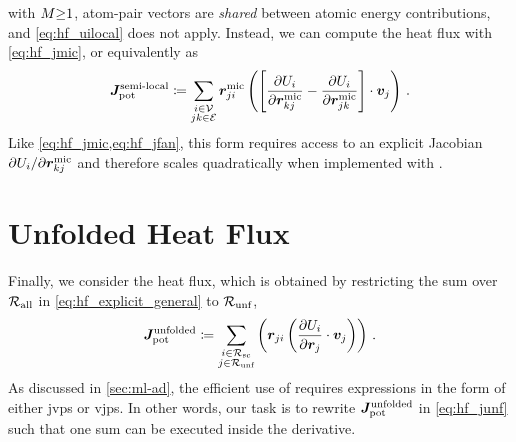  \glps with $M{\geq}1$, atom-pair vectors are \emph{shared} between atomic energy contributions, and \cref{eq:hf_uilocal} does not apply. Instead, we can compute the heat flux with \cref{eq:hf_jmic}, or equivalently as
\begin{equation}
	\Jsl \defas \sum_{\substack{i \in \vertices \\ jk \in \edges}} \Rm_{ji} \left( \left[\durm{i}{k}{j} - \durm{i}{j}{k} \right] \cdot \V_j \right) \, .\label{eq:hf_jmpnn}
\end{equation}
Like \cref{eq:hf_jmic,eq:hf_jfan}, this form requires access to an explicit Jacobian $\partial U_{i} / \partial \boldsymbol{r}^{\text{mic}}_{kj}$ and therefore scales quadratically when implemented with \ad.


\clearpage
\section{Unfolded Heat Flux}
\label{sec:hf_unf}

Finally, we consider the  heat flux, which is obtained by restricting the sum over $\mathcal{R_{\text{all}}}$ in \cref{eq:hf_explicit_general} to $\mathcal{R_{\text{unf}}}$,
\begin{equation}
	\Junf \defas \sum_{\substack{i \in \Rsc \\ j \in \Runf}} \left(\R_{ji} \left(\dur{i}{j}{} \cdot \V_j\right) \right) \, . \label{eq:hf_junf}
\end{equation}
As discussed in \cref{sec:ml-ad}, the efficient use of \ad requires expressions in the form of either \glspl{jvp} or \glspl{vjp}.
In other words, our task is to rewrite $\boldsymbol{J}^{\text{unfolded}}_\text{pot}$ in \cref{eq:hf_junf} such that one sum can be executed inside the derivative.


